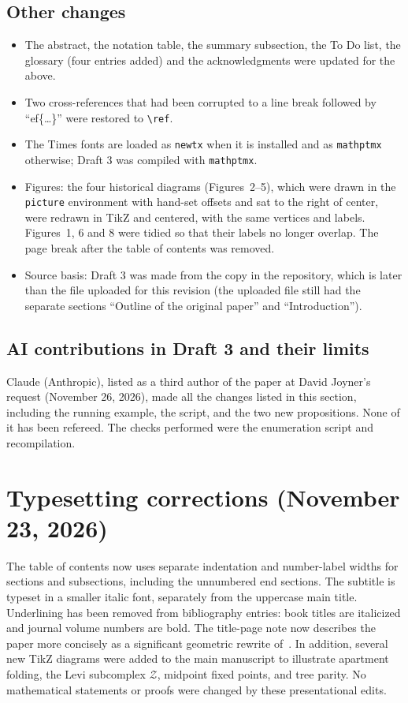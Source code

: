 \documentclass[12pt,letterpaper]{amsart}
\begin{document}
\subsection*{Other changes}
\begin{itemize}
\item The abstract, the notation table, the summary subsection, the
To Do list, the glossary (four entries added) and the acknowledgments
were updated for the above.
\item Two cross-references that had been corrupted to a line break
followed by ``ef\{\dots\}'' were restored to \verb|\ref|.
\item The Times fonts are loaded as \texttt{newtx} when it is
installed and as \texttt{mathptmx} otherwise; Draft 3 was compiled
with \texttt{mathptmx}.
\item Figures: the four historical diagrams (Figures~2--5), which were
drawn in the \texttt{picture} environment with hand-set offsets and
sat to the right of center, were redrawn in TikZ and centered, with
the same vertices and labels. Figures~1, 6 and 8 were tidied so that
their labels no longer overlap. The page break after the table of
contents was removed.
\item Source basis: Draft 3 was made from the copy in the repository,
which is later than the file uploaded for this revision (the uploaded
file still had the separate sections ``Outline of the original paper''
and ``Introduction'').
\end{itemize}

\subsection*{AI contributions in Draft 3 and their limits}
Claude (Anthropic), listed as a third author of the paper at David
Joyner's request (November 26, 2026), made all the changes listed in
this section,
including the running example, the script, and the two new
propositions. None of it has been refereed. The checks performed were
the enumeration script and recompilation.

\section*{Typesetting corrections (November 23, 2026)}
The table of contents now uses separate indentation and number-label
widths for sections and subsections, including the unnumbered end
sections. The subtitle is typeset in a smaller italic font, separately
from the uppercase main title. Underlining has been removed from
bibliography entries: book titles are italicized and journal volume
numbers are bold. The title-page note now describes the paper more concisely as a significant geometric rewrite of~\cite{Jo90}. In addition, several new TikZ diagrams were added to the main manuscript to illustrate apartment folding, the Levi subcomplex $\mathcal Z$, midpoint fixed points, and tree parity. No mathematical statements or proofs were changed by these presentational edits.
\end{document}
